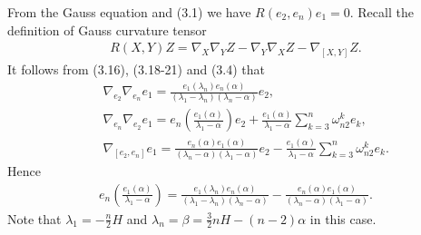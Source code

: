 \documentclass[twoside,reqno,A4]{amsart}
\theoremstyle{definition}
\theoremstyle{remark}
\numberwithin{equation}{section}
\begin{document}
From the Gauss equation and (3.1) we have $R(e_2,e_n)e_1=0$. Recall
the definition of Gauss curvature tensor
\begin{eqnarray*}
R(X,Y)Z=\nabla_X\nabla_YZ-\nabla_Y\nabla_XZ-\nabla_{[X,Y]}Z.
\end{eqnarray*}
It follows from (3.16), (3.18-21) and (3.4) that
\begin{eqnarray*}
&&\nabla_{e_2}\nabla_{e_n}e_1=\frac{e_1(\lambda_n)e_n(\alpha)}{(\lambda_1-\lambda_n)(\lambda_n-\alpha)}e_2,\\
&&\nabla_{e_n}\nabla_{e_2}e_1=e_n(\frac{e_1(\alpha)}{\lambda_1-\alpha})e_2+\frac{e_1(\alpha)}{\lambda_1-\alpha}\sum_{k=3}^{n}\omega_{n2}^ke_k,\\
&&\nabla_{[e_2,e_n]}e_1=\frac{e_n(\alpha)e_1(\alpha)}{(\lambda_n-\alpha)(\lambda_1-\alpha)}
e_2-\frac{e_1(\alpha)}{\lambda_1-\alpha}\sum_{k=3}^{n}\omega_{n2}^ke_k.
\end{eqnarray*}
Hence
\begin{eqnarray}
e_n(\frac{e_1(\alpha)}{\lambda_1-\alpha})=\frac{e_1(\lambda_n)e_n(\alpha)}{(\lambda_1-\lambda_n)(\lambda_n-\alpha)}-
\frac{e_n(\alpha)e_1(\alpha)}{(\lambda_n-\alpha)(\lambda_1-\alpha)}.
\end{eqnarray}
Note that $\lambda_1=-\frac{n}{2}H$ and
$\lambda_n=\beta=\frac{3}{2}nH-(n-2)\alpha$ in this case.
\end{document}
